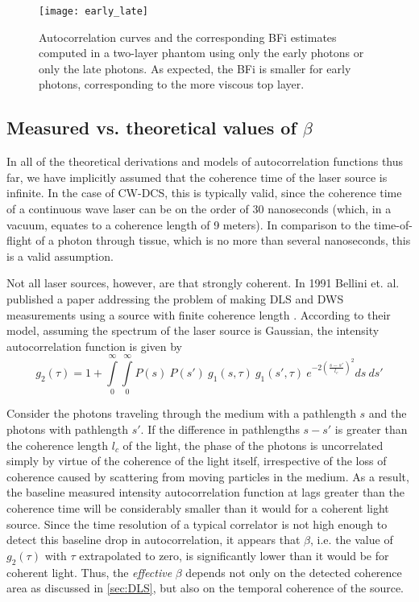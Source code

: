\begin{figure}[tb]
    \centering
    \texttt{[image: early\_late]}
    \caption{Autocorrelation curves and the corresponding BFi estimates computed in a two-layer phantom using only the early photons or only the late photons. As expected, the BFi is smaller for early photons, corresponding to the more viscous top layer.}
    \label{fig:early_late}
\end{figure}

\subsection{Measured vs. theoretical values of $\beta$} \label{sec:theory}
In all of the theoretical derivations and models of autocorrelation functions thus far, we have implicitly assumed that the coherence time of the laser source is infinite. In the case of CW-DCS, this is typically valid, since the coherence time of a continuous wave laser can be on the order of 30 nanoseconds (which, in a vacuum, equates to a coherence length of 9 meters). In comparison to the time-of-flight of a photon through tissue, which is no more than several nanoseconds, this is a valid assumption. 

Not all laser sources, however, are that strongly coherent. In 1991 Bellini et. al. published a paper addressing the problem of making DLS and DWS measurements using a source with finite coherence length \cite{Bellini1991}. According to their model, assuming the spectrum of the laser source is Gaussian, the intensity autocorrelation function is given by
\begin{equation} \label{eq:g2_bellini}
g_2(\tau) = 1 + \int\limits_{0}^{\infty} \int\limits_{0}^{\infty} P(s)~P(s')~ g_1(s,\tau)~ g_1(s',\tau)~ e^{-2\left(\frac{s-s'}{l_c}\right)^2} ds~ds'
\end{equation}

Consider the photons traveling through the medium with a pathlength $s$ and the photons with pathlength $s'$. If the difference in pathlengths $s-s'$ is greater than the coherence length $l_c$ of the light, the phase of the photons is uncorrelated simply by virtue of the coherence of the light itself, irrespective of the loss of coherence caused by scattering from moving particles in the medium. As a result, the baseline measured intensity autocorrelation function at lags greater than the coherence time will be considerably smaller than it would for a coherent light source. Since the time resolution of a typical correlator is not high enough to detect this baseline drop in autocorrelation, it appears that $\beta$, i.e. the value of $g_2(\tau)$ with $\tau$ extrapolated to zero, is significantly lower than it would be for coherent light. Thus, the \emph{effective} $\beta$ depends not only on the detected coherence area as discussed in \autoref{sec:DLS}, but also on the temporal coherence of the source. 

